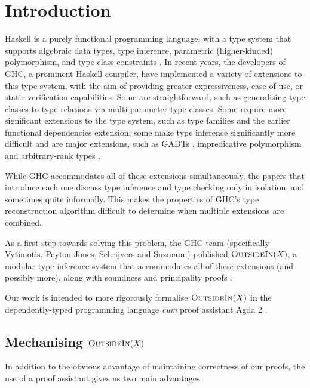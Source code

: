 \documentclass[a4paper]{jfp}
\newcommand{\outsidein}{\textsc{OutsideIn}(X)}
\begin{document}
\section{Introduction}
Haskell is a purely functional programming language, with a type system that supports algebraic data types, type inference, parametric (higher-kinded) polymorphism, and type class constraints \cite{Anonymous:2010we}. In recent years, the developers of GHC, a prominent Haskell compiler, have implemented a variety of extensions to this type system, with the aim of providing greater expressiveness, ease of use, or static verification capabilities. Some are straightforward, such as generalising type classes to type relations via multi-parameter type classes. Some require more significant extensions to the type system, such as type families \cite{citeulike:9320233} and the earlier functional dependencies extension; some make type inference significantly more difficult and are major extensions, such as GADTs \cite{Schrijvers:2009jg}, impredicative polymorphism and arbitrary-rank types \cite{Jones:2007dr}.

While GHC accommodates all of these extensions simultaneously, the papers that introduce each one discuss type inference and type checking only in isolation, and sometimes quite informally. This makes the properties of GHC's type reconstruction algorithm difficult to determine when multiple extensions are combined.  

As a first step towards solving this problem, the GHC team (specifically Vytiniotis, Peyton Jones, Schrijvers and Suzmann) published $\outsidein$, a modular type inference system that accommodates all of these extensions (and possibly more), along with soundness and principality proofs \cite{Vytiniotis:2011:OMT:2139531.2139533}. 

Our work is intended to more rigorously formalise $\outsidein$ in the dependently-typed programming language \emph{cum} proof assistant Agda 2 \cite{conf/afp/norell08}.

\subsection{Mechanising $\outsidein$}

In addition to the obvious advantage of maintaining correctness of our proofs, the use of a proof assistant gives us two main advantages:
\end{document}
